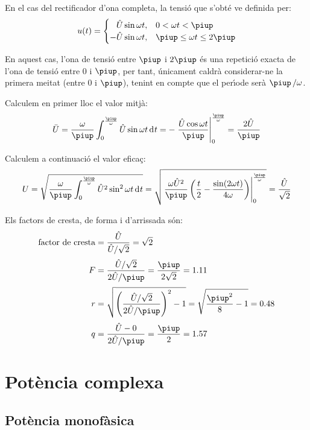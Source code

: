 \begin{exemple}
    En el cas del rectificador d'ona completa, la tensi\'{o} que s'obt\'{e} ve
    definida per:
    \[
    u(t) = \begin{cases} \phantom{-}\hat{U} \sin\omega t, & 0 < \omega t < \piup\\
           -\hat{U} \sin\omega t, & \piup \leq \omega t \leq 2\piup \end{cases}
    \]

    En aquest cas, l'ona de tensi\'{o} entre $\piup$ i $2\piup$ \'{e}s una repetici\'{o}
    exacta de l'ona de tensi\'{o} entre 0 i $\piup$, per tant, \'{u}nicament
    caldr\`{a} considerar-ne la primera meitat (entre 0 i $\piup$), tenint en
    compte que el per\'{\i}ode ser\`{a} $\piup\,/\omega$.

     Calculem en primer lloc el valor mitj\`{a}:
    \[
    \bar{U} = \frac{\omega}{\piup} \int_0^\frac{\piup}{\omega} \hat{U}
    \sin\omega t \diff t  = - \left. \frac{\hat{U} \cos\omega t}{\piup}
    \right|_0^\frac{\piup}{\omega} = \frac{2 \hat{U}}{\piup}
    \]

    Calculem a continuaci\'{o} el valor efica\c{c}:
    \[
    U = \sqrt{\frac{\omega}{\piup} \int_0^\frac{\piup}{\omega} \hat{U}^2
    \sin^2\omega t \diff t } =   \sqrt{\left.\frac{\omega
    \hat{U}^2}{\piup}\left( \frac{t}{2} - \frac{\sin (2\omega t)}{4\omega}
    \right)\right|_0^\frac{\piup}{\omega}}  = \frac{\hat{U}}{\sqrt{2}}
    \]

    Els factors de cresta, de forma i d'arrissada s\'{o}n:
    \begin{align*}
        \text{factor de cresta} &= \frac{\hat{U}}{\hat{U}/\sqrt{2}} = \sqrt{2} \\[0.5ex]
        F &= \frac{\hat{U}/\sqrt{2}}{2 \hat{U}/\piup} =\frac{\piup}{2\sqrt{2}} =
        \num{1,11} \\[0.5ex]
    r &= \sqrt{\left(\frac{\hat{U}/\sqrt{2}}{2 \hat{U}/\piup}\right)^2-1}
    = \sqrt{\frac{\piup^2}{8}-1} = \num{0,48}\\[0.5ex]
    q &=  \frac{\hat{U} - 0}{2 \hat{U}/\piup} = \frac{\piup}{2} = \num{1,57}
    \end{align*}
\end{exemple}

\section{Pot\`{e}ncia complexa}\label{sec:pot_complex} 

\subsection{Pot\`{e}ncia monof\`{a}sica} 

